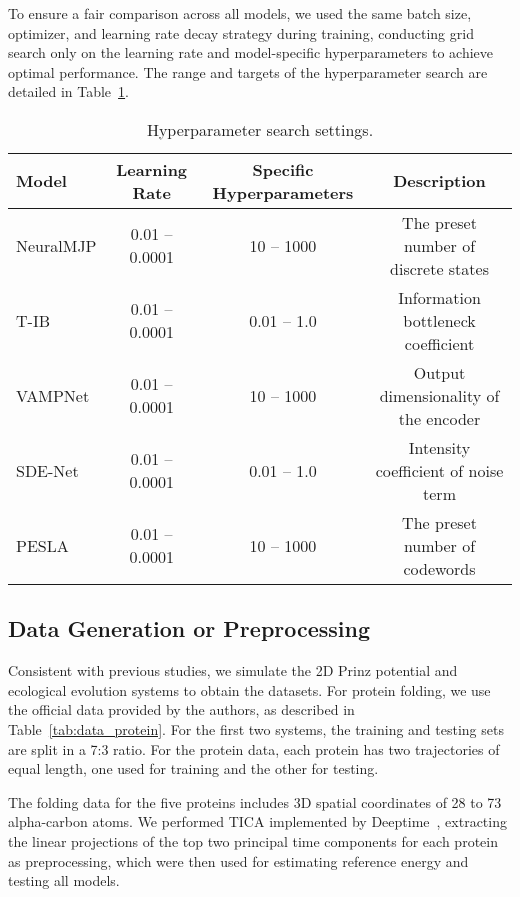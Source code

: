 To ensure a fair comparison across all models, we used the same batch size, optimizer, and learning rate decay strategy during training, conducting grid search only on the learning rate and model-specific hyperparameters to achieve optimal performance. The range and targets of the hyperparameter search are detailed in Table~\ref{tab:hyperparameter_search}.

\begin{table}[!ht]
    \centering
    \caption{Hyperparameter search settings.}
    \label{tab:hyperparameter_search}
    \begin{tabular}{l|c|c|c}
        \hline
        \textbf{Model} & \textbf{Learning Rate} & \textbf{Specific Hyperparameters} & \textbf{Description} \\
        \hline
        NeuralMJP & 0.01 -- 0.0001 & 10 -- 1000 & The preset number of discrete states \\
        T-IB & 0.01 -- 0.0001 & 0.01 -- 1.0 & Information bottleneck coefficient \\
        VAMPNet & 0.01 -- 0.0001 & 10 -- 1000 & Output dimensionality of the encoder \\
        SDE-Net & 0.01 -- 0.0001 & 0.01 -- 1.0 & Intensity coefficient of noise term \\
        PESLA & 0.01 -- 0.0001 & 10 -- 1000 & The preset number of codewords \\
        \hline
    \end{tabular}
\end{table}


\subsection{Data Generation or Preprocessing} \label{app:data_generation}

Consistent with previous studies, we simulate the 2D Prinz potential and ecological evolution systems to obtain the datasets. For protein folding, we use the official data provided by the authors, as described in Table~\ref{tab:data_protein}. For the first two systems, the training and testing sets are split in a 7:3 ratio. For the protein data, each protein has two trajectories of equal length, one used for training and the other for testing.

The folding data for the five proteins includes 3D spatial coordinates of 28 to 73 alpha-carbon atoms. We performed TICA implemented by Deeptime~\citep{hoffmann2021deeptime}, extracting the linear projections of the top two principal time components for each protein as preprocessing, which were then used for estimating reference energy and testing all models.


